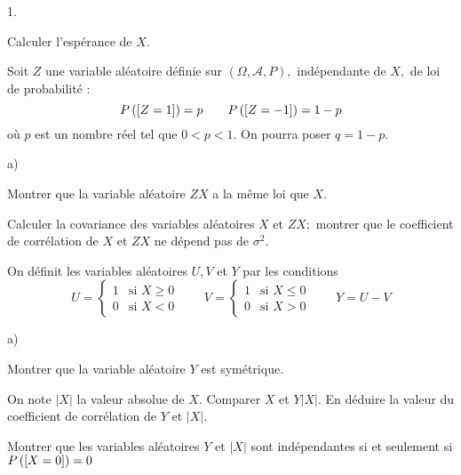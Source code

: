 \documentclass[11pt]{article}%
\begin{document}
\begin{noliste}{1.}
 \setlength{\itemsep}{4mm}
\item Calculer l'espérance de $X.$

\item Soit $Z$ une variable aléatoire définie sur
$(\Omega,\mathcal{A},P),$
indépendante de $X,$ de loi de probabilité :
\[
P\left(\left[ {Z = 1} \right]\right) = p\qquad P\left(\left[ {Z = -1} \right]\right) = 1-p
\]
où $p$ est un nombre réel tel que $0<p<1.$ On pourra poser $q = 1-p.$

\begin{noliste}{a)}
 \setlength{\itemsep}{2mm}
\item Montrer que la variable aléatoire $ZX$ a la même loi que $X.$

\item Calculer la covariance des variables aléatoires $X$ et $ZX;$
montrer
que le coefficient de corrélation de $X$ et $ZX$ ne dépend pas de
$\sigma
^{2}.$
\end{noliste}

\item On définit les variables aléatoires $U,V$ et $Y$ par les
conditions 
\[
U = \left\{ 
\begin{array}{cc}
1 & \text{si }X\geq 0 \\
0 & \text{si }X<0
\end{array}
\right. \qquad V = \left\{ 
\begin{array}{cc}
1 & \text{si }X\leq 0 \\
0 & \text{si }X>0
\end{array}
\right. \qquad Y = U-V
\]

\begin{noliste}{a)}
 \setlength{\itemsep}{2mm}
\item Montrer que la variable aléatoire $Y$ est symétrique.

\item On note $\left| X\right| $ la valeur absolue de $X.$ Comparer $X$
et $Y\left| X\right|.$ En déduire la valeur du coefficient de
corrélation de $Y$ et $\left| X\right|.$

\item Montrer que les variables aléatoires $Y$ et $\left| X\right| $
sont indépendantes si et seulement si $P\left(\left[ {X = 0} \right]\right) = 0$
\end{noliste}
\end{noliste}

\label{fin}
\end{document}
